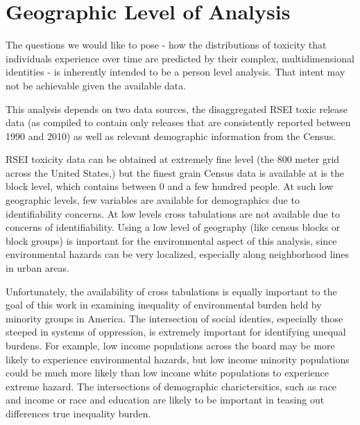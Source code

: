\documentclass[12pt,twoside]{dukestatscithesis}
\theoremstyle{definition}
\theoremstyle{definition}
\theoremstyle{definition}
\theoremstyle{remark}
\begin{document}
\section{Geographic Level of
Analysis}\label{geographic-level-of-analysis}

The questions we would like to pose - how the distributions of toxicity
that individuals experience over time are predicted by their complex,
multidimensional identities - is inherently intended to be a person
level analysis. That intent may not be achievable given the available
data.

This analysis depends on two data sources, the disaggregated RSEI toxic
release data (as compiled to contain only releases that are consistently
reported between 1990 and 2010) as well as relevant demographic
information from the Census.

RSEI toxicity data can be obtained at extremely fine level (the 800
meter grid across the United States,) but the finest grain Census data
is available at is the block level, which contains between 0 and a few
hundred people. At such low geographic levels, few variables are
available for demographics due to identifiability concerns. At low
levels cross tabulations are not available due to concerns of
identifiability. Using a low level of geography (like census blocks or
block groups) is important for the environmental aspect of this
analysis, since environmental hazards can be very localized, especially
along neighborhood lines in urban areas.

Unfortunately, the availability of cross tabulations is equally
important to the goal of this work in examining inequality of
environmental burden held by minority groups in America. The
intersection of social identies, especially those steeped in systems of
oppression, is extremely important for identifying unequal burdens. For
example, low income populations across the board may be more likely to
experience environmental hazards, but low income minority populations
could be much more likely than low income white populations to
experience extreme hazard. The intersections of demographic
charictersitics, such as race and income or race and education are
likely to be important in teasing out differences true inequality
burden.
\end{document}
